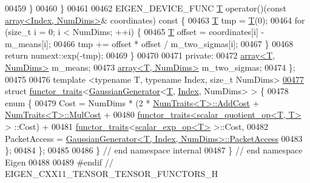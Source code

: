 \begin{DoxyCode}
00459     \}
00460   \}
00461 
00462   EIGEN\_DEVICE\_FUNC \hyperlink{group___sparse_core___module}{T} operator()(\textcolor{keyword}{const} \hyperlink{class_eigen_1_1array}{array<Index, NumDims>}& coordinates)\textcolor{keyword}{ const }\{
00463     \hyperlink{group___sparse_core___module}{T} tmp = \hyperlink{group___sparse_core___module}{T}(0);
00464     \textcolor{keywordflow}{for} (\textcolor{keywordtype}{size\_t} i = 0; i < NumDims; ++i) \{
00465       \hyperlink{group___sparse_core___module}{T} offset = coordinates[i] - m\_means[i];
00466       tmp += offset * offset / m\_two\_sigmas[i];
00467     \}
00468     \textcolor{keywordflow}{return} numext::exp(-tmp);
00469   \}
00470 
00471  \textcolor{keyword}{private}:
00472   \hyperlink{class_eigen_1_1array}{array<T, NumDims>} m\_means;
00473   \hyperlink{class_eigen_1_1array}{array<T, NumDims>} m\_two\_sigmas;
00474 \};
00475 
00476 \textcolor{keyword}{template} <\textcolor{keyword}{typename} T, \textcolor{keyword}{typename} Index, \textcolor{keywordtype}{size\_t} NumDims>
\hyperlink{struct_eigen_1_1internal_1_1functor__traits_3_01_gaussian_generator_3_01_t_00_01_index_00_01_num_dims_01_4_01_4}{00477} \textcolor{keyword}{struct }\hyperlink{struct_eigen_1_1internal_1_1functor__traits}{functor\_traits}<\hyperlink{class_eigen_1_1internal_1_1_gaussian_generator}{GaussianGenerator}<\hyperlink{group___sparse_core___module}{T}, \hyperlink{namespace_eigen_a62e77e0933482dafde8fe197d9a2cfde}{Index}, NumDims> > \{
00478   \textcolor{keyword}{enum} \{
00479     Cost = NumDims * (2 * \hyperlink{group___core___module_struct_eigen_1_1_num_traits}{NumTraits<T>::AddCost} + 
      \hyperlink{group___core___module_struct_eigen_1_1_num_traits}{NumTraits<T>::MulCost} +
00480                       \hyperlink{struct_eigen_1_1internal_1_1functor__traits}{functor\_traits<scalar\_quotient\_op<T, T>} >
      ::Cost) +
00481            \hyperlink{struct_eigen_1_1internal_1_1functor__traits}{functor\_traits}<\hyperlink{struct_eigen_1_1internal_1_1scalar__exp__op}{scalar\_exp\_op<T>} >::Cost,
00482     PacketAccess = \hyperlink{class_eigen_1_1internal_1_1_gaussian_generator}{GaussianGenerator<T, Index, NumDims>::PacketAccess}
00483   \};
00484 \};
00485 
00486 \} \textcolor{comment}{// end namespace internal}
00487 \} \textcolor{comment}{// end namespace Eigen}
00488 
00489 \textcolor{preprocessor}{#endif // EIGEN\_CXX11\_TENSOR\_TENSOR\_FUNCTORS\_H}
\end{DoxyCode}
